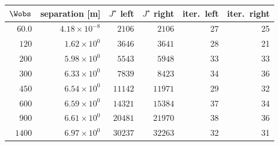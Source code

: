 \begin{tabular}{rrrrrr}
  \toprule
  $\Wobs$ & separation [m] & $J^\star$ left & $J^\star$ right & iter.\ left & iter.\ right \\
  \midrule
  $60.0$ & $4.18\times 10^{-8}$ & $2106$ & $2106$ & 27 & 25 \\
  $120$ & $1.62\times 10^{0}$ & $3646$ & $3641$ & 28 & 21 \\
  $200$ & $5.98\times 10^{0}$ & $5543$ & $5948$ & 33 & 33 \\
  $300$ & $6.33\times 10^{0}$ & $7839$ & $8423$ & 34 & 36 \\
  $450$ & $6.54\times 10^{0}$ & $11142$ & $11971$ & 29 & 32 \\
  $600$ & $6.59\times 10^{0}$ & $14321$ & $15384$ & 37 & 34 \\
  $900$ & $6.61\times 10^{0}$ & $20481$ & $21970$ & 38 & 36 \\
  $1400$ & $6.97\times 10^{0}$ & $30237$ & $32263$ & 32 & 31 \\
  \bottomrule
\end{tabular}
